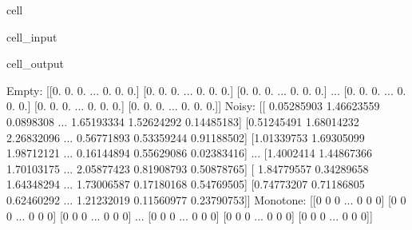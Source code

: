 \documentclass[letterpaper,10pt,english]{jupyterBook}
\begin{document}
\begin{sphinxuseclass}{cell}\begin{sphinxVerbatimInput}

\begin{sphinxuseclass}{cell_input}
\begin{sphinxVerbatim}[commandchars=\\\{\}]
\end{sphinxVerbatim}

\end{sphinxuseclass}\end{sphinxVerbatimInput}
\begin{sphinxVerbatimOutput}

\begin{sphinxuseclass}{cell_output}
\begin{sphinxVerbatim}[commandchars=\\\{\}]
Empty:
 [[0. 0. 0. ... 0. 0. 0.]
 [0. 0. 0. ... 0. 0. 0.]
 [0. 0. 0. ... 0. 0. 0.]
 ...
 [0. 0. 0. ... 0. 0. 0.]
 [0. 0. 0. ... 0. 0. 0.]
 [0. 0. 0. ... 0. 0. 0.]]
Noisy:
 [[ 0.05285903  1.46623559  0.0898308  ... \PYGZhy{}1.65193334  1.52624292
   0.14485183]
 [\PYGZhy{}0.51245491 \PYGZhy{}1.68014232  2.26832096 ...  0.56771893  0.53359244
  \PYGZhy{}0.91188502]
 [\PYGZhy{}1.01339753  1.69305099 \PYGZhy{}1.98712121 ... \PYGZhy{}0.16144894  0.55629086
   0.02383416]
 ...
 [\PYGZhy{}1.4002414   1.44867366 \PYGZhy{}1.70103175 ... \PYGZhy{}2.05877423  0.81908793
   0.50878765]
 [ 1.84779557  0.34289658  1.64348294 ...  1.73006587 \PYGZhy{}0.17180168
  \PYGZhy{}0.54769505]
 [\PYGZhy{}0.74773207 \PYGZhy{}0.71186805 \PYGZhy{}0.62460292 ... \PYGZhy{}1.21232019  0.11560977
   0.23790753]]
Monotone:
 [[0 0 0 ... 0 0 0]
 [0 0 0 ... 0 0 0]
 [0 0 0 ... 0 0 0]
 ...
 [0 0 0 ... 0 0 0]
 [0 0 0 ... 0 0 0]
 [0 0 0 ... 0 0 0]]
\end{sphinxVerbatim}

\end{sphinxuseclass}\end{sphinxVerbatimOutput}

\end{sphinxuseclass}
\sphinxstepscope
\end{document}
